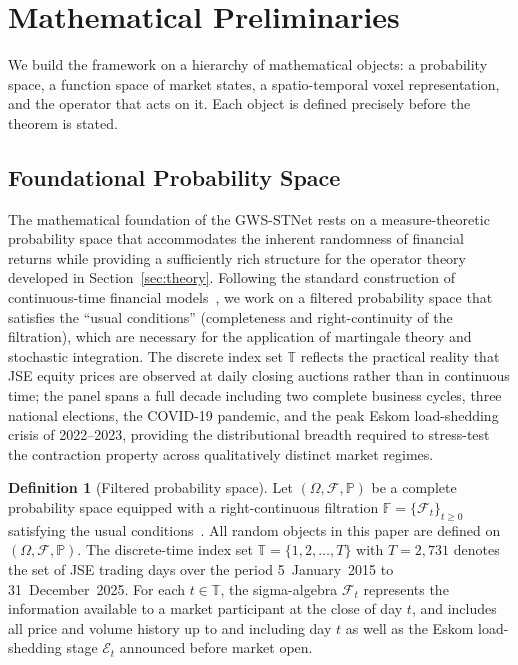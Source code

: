 \documentclass[11pt,a4paper]{article}  %
\newcommand{\Prob}{\mathbb{P}}
\theoremstyle{plain}
\theoremstyle{definition}
\newtheorem{definition}{Definition}[section]
\theoremstyle{remark}
\begin{document}
\section{Mathematical Preliminaries}
\label{sec:prelim}

We build the framework on a hierarchy of mathematical objects: a
probability space, a function space of market states, a spatio-temporal
voxel representation, and the operator that acts on it. Each object
is defined precisely before the theorem is stated.

\subsection{Foundational Probability Space}
\label{subsec:probspace}

The mathematical foundation of the GWS-STNet rests on a measure-theoretic
probability space that accommodates the inherent randomness of financial
returns while providing a sufficiently rich structure for the operator
theory developed in Section~\ref{sec:theory}. Following the standard
construction of continuous-time financial models~\cite{Shreve2004}, we
work on a filtered probability space that satisfies the ``usual
conditions'' (completeness and right-continuity of the filtration),
which are necessary for the application of martingale theory and
stochastic integration. The discrete index set $\mathbb{T}$ reflects
the practical reality that JSE equity prices are observed at daily
closing auctions rather than in continuous time; the panel spans a
full decade including two complete business cycles, three national
elections, the COVID-19 pandemic, and the peak Eskom load-shedding
crisis of 2022--2023, providing the distributional breadth required
to stress-test the contraction property across qualitatively distinct
market regimes.

\begin{definition}[Filtered probability space]
\label{def:prob}
Let $(\Omega,\mathcal{F},\Prob)$ be a complete probability space
equipped with a right-continuous filtration
$\mathbb{F} = \{\mathcal{F}_t\}_{t\geq 0}$ satisfying the usual
conditions~\cite{Williams1991}. All random objects in this paper are
defined on $(\Omega,\mathcal{F},\Prob)$. The discrete-time index
set $\mathbb{T} = \{1,2,\ldots,T\}$ with $T = 2{,}731$ denotes
the set of JSE trading days over the period 5~January~2015 to
31~December~2025. For each $t\in\mathbb{T}$, the sigma-algebra
$\mathcal{F}_t$ represents the information available to a market
participant at the close of day $t$, and includes all price and
volume history up to and including day $t$ as well as the Eskom
load-shedding stage $\mathcal{E}_t$ announced before market open.
\end{definition}
\end{document}
